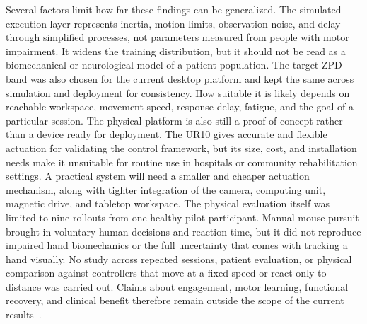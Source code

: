 \documentclass[journal,twoside,web]{ieeecolor2}
\begin{document}
Several factors limit how far these findings can be generalized. The simulated execution layer represents inertia, motion limits, observation noise, and delay through simplified processes, not parameters measured from people with motor impairment. It widens the training distribution, but it should not be read as a biomechanical or neurological model of a patient population. The target ZPD band was also chosen for the current desktop platform and kept the same across simulation and deployment for consistency. How suitable it is likely depends on reachable workspace, movement speed, response delay, fatigue, and the goal of a particular session. The physical platform is also still a proof of concept rather than a device ready for deployment. The UR10 gives accurate and flexible actuation for validating the control framework, but its size, cost, and installation needs make it unsuitable for routine use in hospitals or community rehabilitation settings. A practical system will need a smaller and cheaper actuation mechanism, along with tighter integration of the camera, computing unit, magnetic drive, and tabletop workspace. The physical evaluation itself was limited to nine rollouts from one healthy pilot participant. Manual mouse pursuit brought in voluntary human decisions and reaction time, but it did not reproduce impaired hand biomechanics or the full uncertainty that comes with tracking a hand visually. No study across repeated sessions, patient evaluation, or physical comparison against controllers that move at a fixed speed or react only to distance was carried out. Claims about engagement, motor learning, functional recovery, and clinical benefit therefore remain outside the scope of the current results~\cite{b2,b7,b11,b15,b16}.
\end{document}
